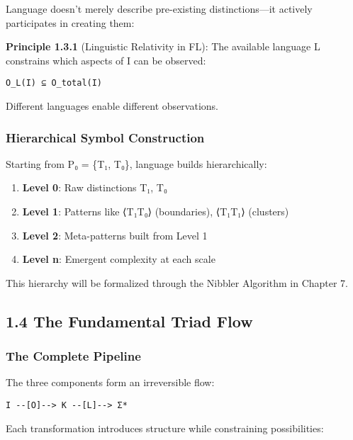 Language doesn't merely describe pre-existing distinctions---it actively
participates in creating them:

\textbf{Principle 1.3.1} (Linguistic Relativity in FL): The available
language L constrains which aspects of I can be observed:

\begin{verbatim}
O_L(I) ⊆ O_total(I)
\end{verbatim}

Different languages enable different observations.

\subsubsection{Hierarchical Symbol
Construction}\label{hierarchical-symbol-construction}

Starting from P₀ = \{T₁, T₀\}, language builds hierarchically:

\begin{enumerate}
\def\labelenumi{\arabic{enumi}.}
\tightlist
\item
  \textbf{Level 0}: Raw distinctions T₁, T₀
\item
  \textbf{Level 1}: Patterns like ⟨T₁T₀⟩ (boundaries), ⟨T₁T₁⟩ (clusters)
\item
  \textbf{Level 2}: Meta-patterns built from Level 1
\item
  \textbf{Level n}: Emergent complexity at each scale
\end{enumerate}

This hierarchy will be formalized through the Nibbler Algorithm in
Chapter 7.

\subsection{1.4 The Fundamental Triad
Flow}\label{the-fundamental-triad-flow}

\subsubsection{The Complete Pipeline}\label{the-complete-pipeline}

The three components form an irreversible flow:

\begin{verbatim}
I --[O]--> K --[L]--> Σ*
\end{verbatim}

Each transformation introduces structure while constraining
possibilities:

